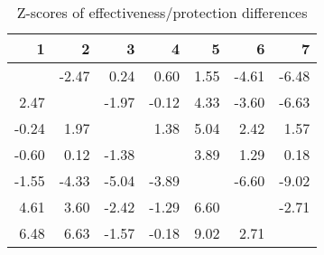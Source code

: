 \begin{table}[ht]
\centering
\begin{tabular}{rrrrrrr}
  \hline
1 & 2 & 3 & 4 & 5 & 6 & 7 \\ 
  \hline
 & -2.47 & 0.24 & 0.60 & 1.55 & -4.61 & -6.48 \\ 
  2.47 &  & -1.97 & -0.12 & 4.33 & -3.60 & -6.63 \\ 
  -0.24 & 1.97 &  & 1.38 & 5.04 & 2.42 & 1.57 \\ 
  -0.60 & 0.12 & -1.38 &  & 3.89 & 1.29 & 0.18 \\ 
  -1.55 & -4.33 & -5.04 & -3.89 &  & -6.60 & -9.02 \\ 
  4.61 & 3.60 & -2.42 & -1.29 & 6.60 &  & -2.71 \\ 
  6.48 & 6.63 & -1.57 & -0.18 & 9.02 & 2.71 &  \\ 
   \hline
\end{tabular}
\caption{Z-scores of effectiveness/protection differences} 
\end{table}

